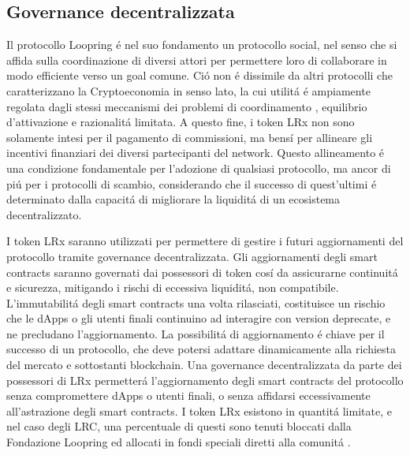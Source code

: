\documentclass[UTF8,nofonts]{article}
\begin{document}
\begin{multicols}{2}
\subsection{Governance decentralizzata}
Il protocollo Loopring \'e nel suo fondamento un protocollo social, nel senso che si affida sulla coordinazione di diversi attori per permettere loro di collaborare in modo efficiente verso un goal comune. Ci\'o non \'e dissimile da altri protocolli che caratterizzano la Cryptoeconomia in senso lato, la cui utilit\'a \'e ampiamente regolata dagli stessi meccanismi dei problemi di coordinamento \cite{vitalikgovernance}, equilibrio d'attivazione e razionalit\'a limitata. A questo fine, i token LRx non sono solamente intesi per il pagamento di commissioni, ma bens\'i per allineare gli incentivi finanziari dei diversi partecipanti del network. Questo allineamento \'e una condizione fondamentale per l'adozione di qualsiasi protocollo, ma ancor di pi\'u per i protocolli di scambio, considerando che il successo di quest'ultimi \'e determinato dalla capacit\'a di migliorare la liquidit\'a di un ecosistema decentralizzato.

I token LRx saranno utilizzati per permettere di gestire i futuri aggiornamenti del protocollo tramite governance decentralizzata. Gli aggiornamenti degli smart contracts saranno governati dai possessori di token cos\'i da assicurarne continuit\'a e sicurezza, mitigando i rischi di eccessiva liquidit\'a, non compatibile. L'immutabilit\'a degli smart contracts una volta rilasciati, costituisce un rischio che le dApps o gli utenti finali continuino ad interagire con version deprecate, e ne precludano l'aggiornamento.
La possibilit\'a di aggiornamento \'e chiave per il successo di un protocollo, che deve potersi adattare dinamicamente alla richiesta del mercato e sottostanti blockchain. Una governance decentralizzata da parte dei possessori di LRx permetter\'a l'aggiornamento degli smart contracts del protocollo senza compromettere dApps o utenti finali, o senza affidarsi eccessivamente all'astrazione degli smart contracts. I token LRx esistono in quantit\'a limitate, e nel caso degli LRC, una percentuale di questi sono tenuti bloccati dalla Fondazione Loopring ed allocati in fondi speciali diretti alla comunit\'a \cite{LRCtokendoc}.


\end{multicols}
\end{document}
